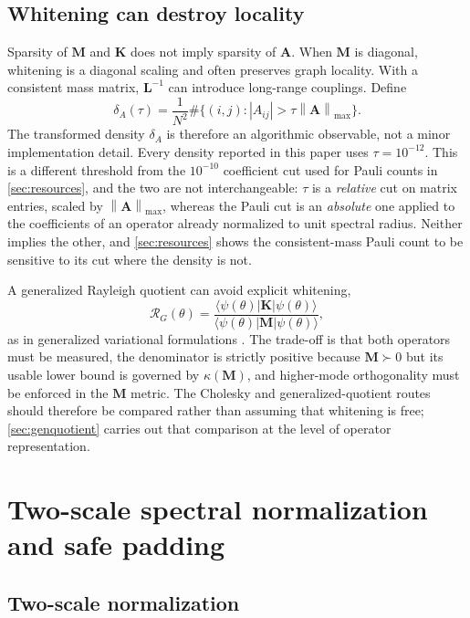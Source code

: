 \documentclass{ieeeaccess}
\newcommand{\M}{\mathbf{M}}
\newcommand{\K}{\mathbf{K}}
\newcommand{\A}{\mathbf{A}}
\newcommand{\norm}[1]{\left\lVert #1\right\rVert}
\begin{document}
\subsection{Whitening can destroy locality}

Sparsity of $\M$ and $\K$ does not imply sparsity of $\A$. When $\M$ is diagonal, whitening is a diagonal scaling and often preserves graph locality. With a consistent mass matrix, $\mathbf L^{-1}$ can introduce long-range couplings. Define
\begin{equation}
\delta_A(\tau)=\frac{1}{N^2}\#\{(i,j):|A_{ij}|>\tau\norm{\A}_{\max}\}.
\label{eq:density}
\end{equation}
The transformed density $\delta_A$ is therefore an algorithmic observable, not a minor implementation detail. Every density reported in this paper uses $\tau=10^{-12}$. This is a different threshold from the $10^{-10}$ coefficient cut used for Pauli counts in \cref{sec:resources}, and the two are not interchangeable: $\tau$ is a \emph{relative} cut on matrix entries, scaled by $\norm{\A}_{\max}$, whereas the Pauli cut is an \emph{absolute} one applied to the coefficients of an operator already normalized to unit spectral radius. Neither implies the other, and \cref{sec:resources} shows the consistent-mass Pauli count to be sensitive to its cut where the density is not.

A generalized Rayleigh quotient can avoid explicit whitening,
\begin{equation}
\mathcal R_G(\theta)=
\frac{\langle\psi(\theta)|\K|\psi(\theta)\rangle}
{\langle\psi(\theta)|\M|\psi(\theta)\rangle},
\label{eq:generalized_rq}
\end{equation}
as in generalized variational formulations \cite{Sato2023}. The trade-off is that both operators must be measured, the denominator is strictly positive because $\M\succ0$ but its usable lower bound is governed by $\kappa(\M)$, and higher-mode orthogonality must be enforced in the $\M$ metric. The Cholesky and generalized-quotient routes should therefore be compared rather than assuming that whitening is free; \cref{sec:genquotient} carries out that comparison at the level of operator representation.

\section{Two-scale spectral normalization and safe padding}
\label{sec:scaling}

\subsection{Two-scale normalization}
\end{document}
